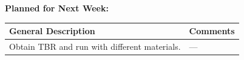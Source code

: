 \documentclass{article}
\begin{document}
\textbf{Planned for Next Week: }

\renewcommand{\arraystretch}{1.5}
\begin{table}[H]
    \centering
    \begin{tabularx}{0.95\textwidth} { 
        | >{\centering\arraybackslash}X
        | >{\centering\arraybackslash}X | }

    \hline
    \textbf{General Description} & \textbf{Comments} \\
    \hline
    Obtain TBR and run with different materials.  & --- \\
    \hline
    \end{tabularx}
\end{table}
\end{document}
